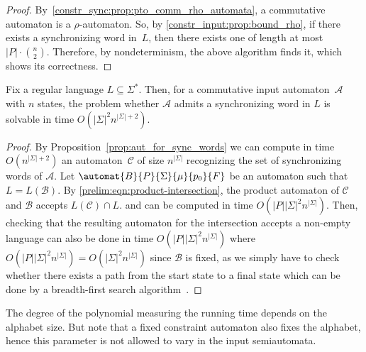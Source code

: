 \begin{proof}
	By~\cref{constr_sync:prop:pto_comm_rho_automata},
	a commutative automaton is a $\rho$-automaton.
	So, by \cref{constr_input:prop:bound_rho}, 
	if there exists a synchronizing word in~$L$,
	then there exists one of length at most~$|P|\cdot \binom{n}{2}$.
	Therefore, by nondeterminism, 
	the above algorithm finds it, which shows its correctness.
\end{proof}

	\begin{theorem}
		\label{thm:main_theorem_comm_input}
		Fix a regular language $L \subseteq \Sigma^*$.
		Then, for a commutative input automaton~$\mathcal A$
		with $n$ states,
		the problem whether $\mathcal A$ admits a synchronizing
		word in $L$ is solvable in time $O(|\Sigma|^2 n^{|\Sigma|+2})$.
	\end{theorem}
	\begin{proof}
		By Proposition~\ref{prop:aut_for_sync_words} we
		can compute in time $O(n^{|\Sigma|+2})$ an
		automaton~$\mathcal C$ of size $n^{|\Sigma|}$
		recognizing the set
		of synchronizing words of $\mathcal A$.
		Let $\automat{B}{P}{\Sigma}{\mu}{p_0}{F}$
		be an automaton such that $L = L(\mathcal B)$.
		By \cref{prelim:eqn:product-intersection}, the product automaton of $\mathcal C$ and $\mathcal B$
		accepts $L(\mathcal C) \cap L$.
		and can be computed in time $O(|P| |\Sigma|^2 n^{|\Sigma|})$.
		Then, checking that the resulting automaton
		for the intersection accepts a non-empty
		language can also be done in  
		time $O(|P||\Sigma|^2n^{|\Sigma|})$ 
		where $O(|P||\Sigma|^2n^{|\Sigma|}) = O(|\Sigma|^2n^{|\Sigma|})$ since $\mathcal B$ is fixed,
		as we simply have to check whether there exists a path from the start state to a final state
		which can be done by a breadth-first search algorithm~\cite{cormen01introduction}.
	\end{proof}

The degree of the polynomial measuring the running time depends on the alphabet size. But note that a fixed
constraint automaton also fixes the alphabet, hence this parameter is not allowed to vary in the input semiautomata.